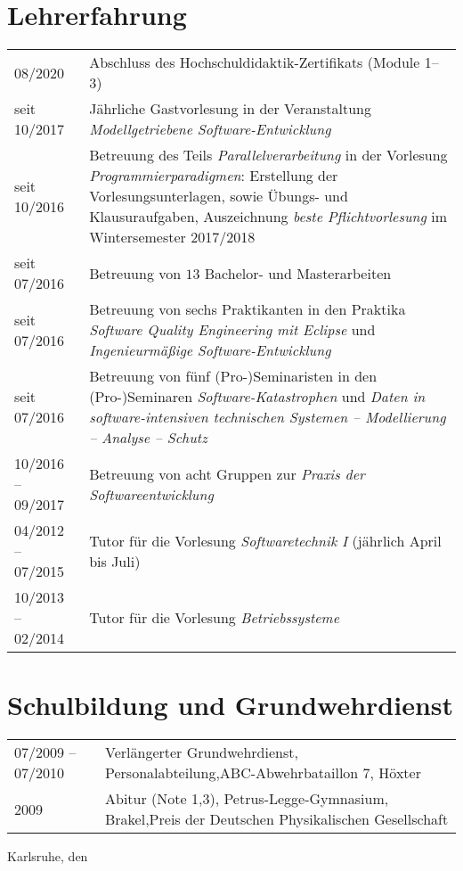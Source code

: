 \section*{Lehrerfahrung}
\begin{tabular}{@{}p{3.1cm} p{11cm}}
08/2020 &
Abschluss des Hochschuldidaktik-Zertifikats (Module 1--3)\\
seit 10/2017 &
Jährliche Gastvorlesung in der Veranstaltung \emph{Modellgetriebene Software-Entwicklung}\\
seit 10/2016 & 
Betreuung des Teils \emph{Parallelverarbeitung} in der Vorlesung \emph{Programmierparadigmen}: Erstellung der Vorlesungsunterlagen, sowie Übungs- und Klausuraufgaben,\newline
Auszeichnung \emph{beste Pflichtvorlesung} im Wintersemester 2017/2018\\
seit 07/2016 &
Betreuung von $13$ Bachelor- und Masterarbeiten\\
seit 07/2016 & Betreuung von sechs Praktikanten in den Praktika \emph{Software Quality Engineering mit Eclipse} und \emph{Ingenieurmäßige Software-Entwicklung} \\
seit 07/2016 & Betreuung von fünf (Pro-)Seminaristen in den (Pro-)Seminaren \emph{Software-Katastrophen} und \emph{Daten in software-intensiven technischen Systemen -- Modellierung -- Analyse -- Schutz}\\
10/2016 -- 09/2017 &
Betreuung von acht Gruppen zur \emph{Praxis der Softwareentwicklung}\\
04/2012 -- 07/2015 & Tutor für die Vorlesung \emph{Softwaretechnik I} (jährlich April bis Juli)\\
10/2013 -- 02/2014 & Tutor für die Vorlesung \emph{Betriebssysteme}
\end{tabular}

\section*{Schulbildung und Grundwehrdienst}
\begin{tabular}{@{}p{3.1cm} p{11cm}}
07/2009 -- 07/2010 & Verlängerter Grundwehrdienst, Personalabteilung,\newline ABC-Abwehrbataillon 7, Höxter\\
2009 & Abitur (Note 1,3), \newline Petrus-Legge-Gymnasium, Brakel,\newline Preis der Deutschen Physikalischen Gesellschaft
\end{tabular}

\vspace{2\baselineskip}
\noindent Karlsruhe, den \disssubmissiondate

\vspace{2\baselineskip}
\noindent \dissauthor
